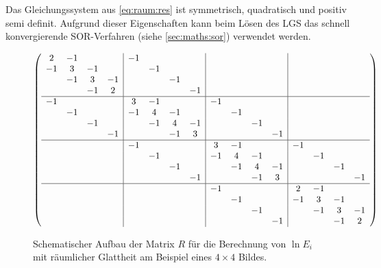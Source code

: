 Das Gleichungssystem aus \ref{eq:raum:res} ist symmetrisch, quadratisch und positiv semi definit. Aufgrund dieser Eigenschaften kann beim Lösen des \gls{LGS} das schnell konvergierende SOR-Verfahren (siehe \autoref{sec:maths:sor}) verwendet werden. 

\begin{figure}
  \begin{center}
\begin{align*}
    \left(
    \begin{array}{cccc|cccc|cccc|cccc}
    2 & -1 &   &    &-1 & & & & & & & & &    \\
    -1 & 3 & -1 &    & &-1 & & & && & & &    \\
    & -1 & 3 & -1    & & & -1 & & & & & & &    \\
    & & -1 & 2      & & & & -1 & & && & & &    \\
    \hline
    -1& & & &       3& -1 & & &     -1& & & &    \\
    & -1& & &       -1&4& -1 & &     &-1& & & &    \\
    & & -1&         & & -1 & 4 & -1& &&-1& & & &    \\    
    & & &-1         & & & -1 & 3 &  &&&-1& & & &    \\
    \hline
    & & & &    -1& & & &       3& -1 & & &     -1\\
    & & & &    & -1& & &       -1&4& -1 & &     &-1\\
    & & & &    & & -1&         & & -1 & 4 & -1& &&-1\\    
    & & & &    & & &-1         & & & -1 & 3 &  &&&-1\\
    \hline
    & & & &    & & & &    -1& & & &       2& -1\\
    & & & &    & & & &    & -1& & &       -1&3& -1\\
    & & & &    & & & &    & & -1&         & & -1 & 3 & -1\\    
    & & & &    & & & &    & & &-1         & & & -1 & 2\\
    \end{array}
    \right)
\end{align*}
\end{center}
\caption{Schematischer Aufbau der Matrix $R$ für die Berechnung von $\ln E_i$ mit räumlicher Glattheit am Beispiel eines $4 \times 4$ Bildes.}
\label{fig:raum:matrix}
\end{figure}


